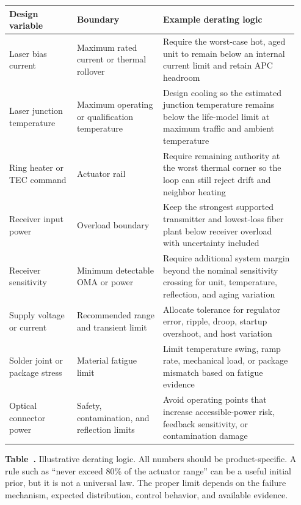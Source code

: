 \begin{table}[ht]
\label{tab:derating-examples}%
\centering
\setlength{\tabcolsep}{3pt}%
\footnotesize
\renewcommand{\arraystretch}{1.12}%
\begin{tabular}{@{}p{0.22\linewidth}p{0.28\linewidth}p{0.44\linewidth}@{}}
\toprule
Design variable & Boundary & Example derating logic \\
\midrule
Laser bias current & Maximum rated current or thermal
rollover & Require the worst-case hot, aged unit to remain below an internal
current limit and retain APC headroom \\
\addlinespace[0.45em]
Laser junction temperature & Maximum operating or qualification
temperature & Design cooling so the estimated junction temperature remains
below the life-model limit at maximum traffic and ambient temperature \\
\addlinespace[0.45em]
Ring heater or TEC command & Actuator rail & Require remaining authority at
the worst thermal corner so the loop can still reject drift and neighbor
heating \\
\addlinespace[0.45em]
Receiver input power & Overload boundary & Keep the strongest supported
transmitter and lowest-loss fiber plant below receiver overload with
uncertainty included \\
\addlinespace[0.45em]
Receiver sensitivity & Minimum detectable OMA or power & Require additional
system margin beyond the nominal sensitivity crossing for unit, temperature,
reflection, and aging variation \\
\addlinespace[0.45em]
Supply voltage or current & Recommended range and transient limit & Allocate
tolerance for regulator error, ripple, droop, startup overshoot, and host
variation \\
\addlinespace[0.45em]
Solder joint or package stress & Material fatigue limit & Limit temperature
swing, ramp rate, mechanical load, or package mismatch based on fatigue
evidence \\
\addlinespace[0.45em]
Optical connector power & Safety, contamination, and reflection
limits & Avoid operating points that increase accessible-power risk, feedback
sensitivity, or contamination damage \\
\bottomrule
\end{tabular}
\par\medskip
{\raggedright\footnotesize\textbf{Table~\thetable.} Illustrative derating
logic. All numbers should be product-specific. A rule such as ``never exceed
80\% of the actuator range'' can be a useful initial prior, but it is not a
universal law. The proper limit depends on the failure mechanism, expected
distribution, control behavior, and available evidence.\par}
\end{table}

